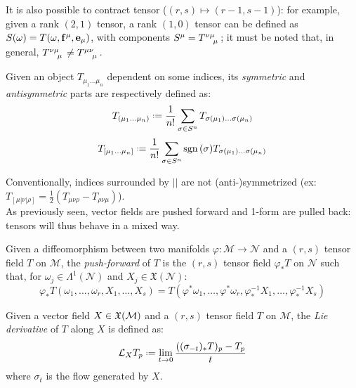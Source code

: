 It is also possible to contract tensor ($ (r,s) \mapsto (r-1,s-1) $): for example, given a rank $ (2,1) $ tensor, a rank $ (1,0) $ tensor can be defined as $ S(\omega) = T(\omega, \mathbf{f}^{\mu}, \mathbf{e}_{\mu}) $, with components $ \tensor{S}{^\mu} = \tensor{T}{^\nu^\mu_\mu} $; it must be noted that, in general, $ \tensor{T}{^\nu^\mu_\mu} \neq \tensor{T}{^\mu^\nu_\mu} $.

\begin{definition}
  Given an object $ T_{\mu_1 \dots \mu_n} $ dependent on some indices, its \textit{symmetric} and \textit{antisymmetric} parts are respectively defined as:
  \begin{equation}
    T_{(\mu_1 \dots \mu_n)} \defeq \frac{1}{n!} \sum_{\sigma \in S^n} T_{\sigma(\mu_1) \dots \sigma(\mu_n)}
    \label{eq:2.29}
  \end{equation}
  \begin{equation}
    T_{[\mu_1 \dots \mu_n]} \defeq \frac{1}{n!} \sum_{\sigma \in S^n} \sgn(\sigma) T_{\sigma(\mu_1) \dots \sigma(\mu_n)}
    \label{eq:2.30}
  \end{equation}
\end{definition}

Conventionally, indices surrounded by $ || $ are not (anti-)symmetrized (ex: $ T_{[\mu|\nu|\rho]} = \frac{1}{2} \left( T_{\mu \nu \rho} - T_{\rho \nu \mu} \right) $).\\
As previously seen, vector fields are pushed forward and 1-form are pulled back: tensors will thus behave in a mixed way.

\begin{definition}
  Given a diffeomorphism between two manifolds $ \varphi : \mathcal{M} \rightarrow \mathcal{N} $ and a $ (r,s) $ tensor field $ T $ on $ \mathcal{M} $, the \textit{push-forward} of $ T $ is the $ (r,s) $ tensor field $ \varphi_* T $ on $ \mathcal{N} $ such that, for $ \omega_j \in \Lambda^1(\mathcal{N}) $ and $ X_j \in \mathfrak{X}(\mathcal{N}) $:
  \begin{equation}
    \varphi_* T(\omega_1, \dots, \omega_r, X_1, \dots, X_s) = T(\varphi^* \omega_1, \dots, \varphi^* \omega_r, \varphi_*^{-1} X_1, \dots, \varphi_*^{-1} X_s)
    \label{eq:2.31}
  \end{equation}
\end{definition}

\begin{definition}
  Given a vector field $ X \in \mathfrak{X}(\mathcal{M}) $ and a $ (r,s) $ tensor field $ T $ on $ \mathcal{M} $, the \textit{Lie derivative} of $ T $ along $ X $ is defined as:
  \begin{equation}
    \ld_X T_p \defeq \lim_{t \rightarrow 0} \frac{((\sigma_{-t})_* T)_p - T_p}{t}
    \label{eq:2.32}
  \end{equation}
  where $ \sigma_t $ is the flow generated by $ X $.
\end{definition}

